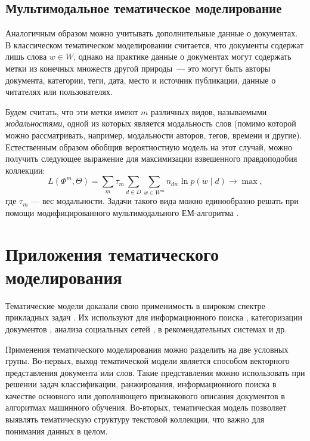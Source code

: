 \subsection{Мультимодальное тематическое моделирование}

Аналогичным образом можно учитывать дополнительные данные о документах. 
В классическом тематическом моделировании считается, что документы содержат лишь слова $w \in W$, однако на практике данные о документах могут содержать метки из конечных множеств другой природы~--- это могут быть авторы документа, категории, теги, дата, место и источник публикации, данные о читателях или пользователях. 

Будем считать, что эти метки имеют $m$ различных видов, называемыми  \textit{модальностями}, одной из которых является модальность слов (помимо которой можно рассматривать, например, модальности авторов, тегов, времени и другие). Естественным образом обобщив вероятностную модель на этот случай, можно получить следующее выражение для максимизации взвешенного правдоподобия коллекции:
\[
    L(\Phi^m, \Theta) = \sum_m \tau_m \sum_{d\in D} \sum_{w \in W^m} n_{dw} \ln p(w \mid d) \rightarrow \max,
\]
где $\tau_m$ --- вес модальности. 
Задачи такого вида можно единообразно решать при помощи модифицированного мультимодального ЕМ-алгоритма \cite{voron15nonbayesian}.

\section{Приложения тематического моделирования}


Тематические модели доказали свою применимость в широком спектре прикладных задач \cite{fntir2017applications}. Их используют для информационного поиска \cite{yi2009, wang2011}, категоризации документов \cite{rubin2012}, анализа социальных сетей \cite{varshney2014, pinto2016}, в рекомендательных системах \cite{wang2011,lee2015} и др.

Применения тематического моделирования можно разделить на две условных групы. Во-первых, выход тематической модели является способом векторного представления документа или слов. Такие представления можно использовать при решении задач классификации, ранжирования, информационного поиска в качестве основного или дополняющего признакового описания документов в алгоритмах машинного обучения. Во-вторых, тематическая модель позволяет выявлять тематическую структуру текстовой коллекции, что важно для понимания данных в целом.

